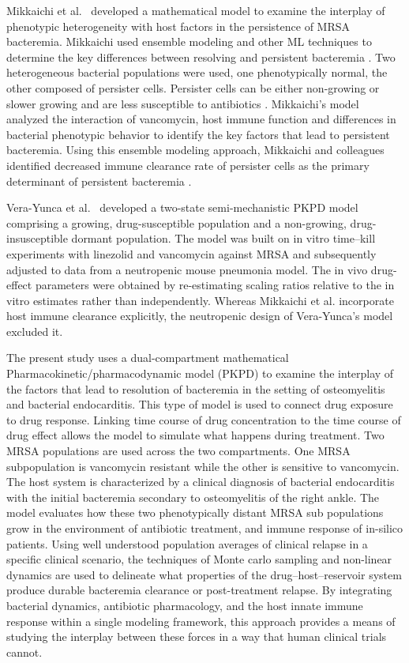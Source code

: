 \documentclass[journal]{IEEEtran}
\begin{document}
Mikkaichi et al.~\cite{Mikkaichi2019} developed a mathematical model to examine the interplay of phenotypic heterogeneity
with host factors in the persistence of MRSA bacteremia.  Mikkaichi used ensemble modeling and other ML techniques to determine
the key differences between resolving and persistent bacteremia \cite{Mikkaichi2019}.
Two heterogeneous bacterial populations were used, one phenotypically normal, the other composed of persister cells.
Persister cells can be either non-growing or slower growing and are less susceptible to antibiotics \cite{Mikkaichi2019}.
Mikkaichi's model analyzed the interaction of vancomycin, host immune function and differences in bacterial phenotypic behavior to identify the key factors that lead to persistent bacteremia.  Using this ensemble modeling approach, Mikkaichi and colleagues identified decreased immune clearance rate of persister cells as the primary determinant of persistent bacteremia \cite{Mikkaichi2019}.

Vera-Yunca et al.~\cite{VeraYunca2025} developed a two-state semi-mechanistic PKPD model comprising a growing,
drug-susceptible population and a non-growing, drug-insusceptible dormant population. The model was built on in vitro time--kill
experiments with linezolid and vancomycin against MRSA and subsequently adjusted to data from a neutropenic mouse pneumonia model.
The in vivo drug-effect parameters were obtained by re-estimating scaling
ratios relative to the in vitro estimates rather than independently.
Whereas Mikkaichi et al. incorporate host immune clearance explicitly, the neutropenic design of Vera-Yunca's model excluded it.

The present study uses a dual-compartment mathematical Pharmacokinetic/pharmacodynamic model (PKPD)
to examine the interplay of the factors that lead to resolution of bacteremia in the setting of osteomyelitis and bacterial endocarditis.
This type of model is used to connect drug exposure to drug response.
Linking time course of drug concentration to the time course of drug effect allows the model to simulate what happens during treatment.
Two MRSA populations are used across the two compartments.  One MRSA subpopulation is vancomycin resistant
while the other is sensitive to vancomycin.  The host system is characterized by a clinical diagnosis of bacterial
endocarditis with the initial bacteremia secondary to osteomyelitis of the right ankle.
The model evaluates how these two phenotypically distant MRSA sub populations grow in the environment of antibiotic treatment,
and immune response of in-silico patients. Using well understood population averages of clinical relapse in a specific clinical scenario, the techniques of Monte carlo sampling and non-linear dynamics are used to delineate what properties of the drug--host--reservoir system produce durable bacteremia clearance or post-treatment relapse. By integrating bacterial dynamics, antibiotic pharmacology, and the host innate immune response within a single modeling framework, this approach provides a means of studying the interplay between these forces in a way that human clinical trials cannot.
\end{document}
